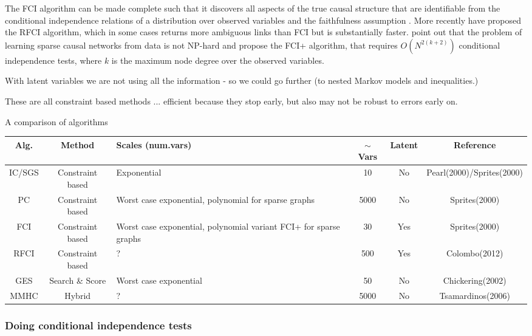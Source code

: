 \documentclass[11pt,a4paper,oneside]{book}
\theoremstyle{plain}
\theoremstyle{definition}
\begin{document}
The FCI algorithm can be made complete such that it discovers all aspects of the true causal structure that are identifiable from the conditional independence relations of a distribution over observed variables and the faithfulness assumption \cite{Zhang2008}. More recently \cite{Colombo2012} have proposed the RFCI algorithm, which in some cases returns more ambiguous links than FCI but is substantially faster. \cite{Claassen2013} point out that the problem of learning sparse causal networks from data is not NP-hard and propose the FCI+ algorithm, that requires $O(N^{2(k+2)})$ conditional independence tests, where $k$ is the maximum node degree over the observed variables. 

With latent variables we are not using all the information - so we could go further (to nested Markov models and inequalities.) \cite{Richardson2012} \cite{Shipster2014}


These are all constraint based methods ... efficient because they stop early, but also may not be robust to errors early on. 

A comparison of algorithms 

\renewcommand{\arraystretch}{1.5}
\begin{tabular}{| c | c | p{4cm} | c | c | c |}
\hline
  \textbf {Alg.} &\textbf{ Method }& \textbf{Scales (num.vars) }& $\sim $ \textbf {Vars} & \textbf {Latent } & \textbf {Reference} \\
  \hline
  IC/SGS & Constraint based & Exponential & 10 & No & Pearl(2000)/Sprites(2000)\\
  \hline
  PC & Constraint based & Worst case exponential, polynomial for sparse graphs & 5000 & No & Sprites(2000) \\ 
  \hline
  FCI & Constraint based & Worst case exponential, polynomial variant FCI+ for sparse graphs & 30 & Yes & Sprites(2000) \\
  \hline
  RFCI & Constraint based & ? & 500 & Yes & Colombo(2012) \\
  \hline
  GES & Search \& Score  & Worst case exponential & 50 & No & Chickering(2002) \\
  \hline
  MMHC & Hybrid & ? & 5000 & No & Tsamardinos(2006) \\
 \hline
\end{tabular}

\subsubsection{Doing conditional independence tests}
\end{document}
